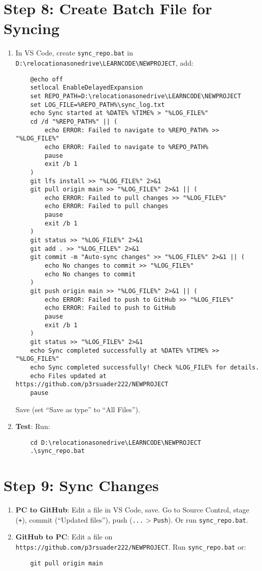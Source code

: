 \documentclass[a4paper,12pt]{article}
\begin{document}
\section{Step 8: Create Batch File for Syncing}
\begin{enumerate}[label=\arabic*.]
    \item In VS Code, create \texttt{sync\_repo.bat} in \texttt{D:\textbackslash relocationasonedrive\textbackslash LEARNCODE\textbackslash NEWPROJECT}, add:
    \begin{verbatim}
    @echo off
    setlocal EnableDelayedExpansion
    set REPO_PATH=D:\relocationasonedrive\LEARNCODE\NEWPROJECT
    set LOG_FILE=%REPO_PATH%\sync_log.txt
    echo Sync started at %DATE% %TIME% > "%LOG_FILE%"
    cd /d "%REPO_PATH%" || (
        echo ERROR: Failed to navigate to %REPO_PATH% >> "%LOG_FILE%"
        echo ERROR: Failed to navigate to %REPO_PATH%
        pause
        exit /b 1
    )
    git lfs install >> "%LOG_FILE%" 2>&1
    git pull origin main >> "%LOG_FILE%" 2>&1 || (
        echo ERROR: Failed to pull changes >> "%LOG_FILE%"
        echo ERROR: Failed to pull changes
        pause
        exit /b 1
    )
    git status >> "%LOG_FILE%" 2>&1
    git add . >> "%LOG_FILE%" 2>&1
    git commit -m "Auto-sync changes" >> "%LOG_FILE%" 2>&1 || (
        echo No changes to commit >> "%LOG_FILE%"
        echo No changes to commit
    )
    git push origin main >> "%LOG_FILE%" 2>&1 || (
        echo ERROR: Failed to push to GitHub >> "%LOG_FILE%"
        echo ERROR: Failed to push to GitHub
        pause
        exit /b 1
    )
    git status >> "%LOG_FILE%" 2>&1
    echo Sync completed successfully at %DATE% %TIME% >> "%LOG_FILE%"
    echo Sync completed successfully! Check %LOG_FILE% for details.
    echo Files updated at https://github.com/p3rsuader222/NEWPROJECT
    pause
    \end{verbatim}
    Save (set ``Save as type'' to ``All Files'').
    \item \textbf{Test}: Run:
    \begin{verbatim}
    cd D:\relocationasonedrive\LEARNCODE\NEWPROJECT
    .\sync_repo.bat
    \end{verbatim}
\end{enumerate}

\section{Step 9: Sync Changes}
\begin{enumerate}[label=\arabic*.]
    \item \textbf{PC to GitHub}: Edit a file in VS Code, save. Go to Source Control, stage (\texttt{+}), commit (``Updated files''), push (\texttt{...} > \texttt{Push}). Or run \texttt{sync\_repo.bat}.
    \item \textbf{GitHub to PC}: Edit a file on \texttt{https://github.com/p3rsuader222/NEWPROJECT}. Run \texttt{sync\_repo.bat} or:
    \begin{verbatim}
    git pull origin main
    \end{verbatim}
\end{enumerate}
\end{document}
